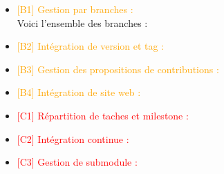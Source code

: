 \begin{itemize}
    \item \textcolor{orange}{[B1] Gestion par branches : }
    \\ Voici l'ensemble des branches : \\ 
    \item \textcolor{orange}{[B2] Intégration de version et tag : }
    \item \textcolor{orange}{[B3] Gestion des propositions de contributions : }
    \item \textcolor{orange}{[B4] Intégration de site web : }
    \item \textcolor{red}{[C1] Répartition de taches et milestone : }
    \item \textcolor{red}{[C2] Intégration continue : }
    \item \textcolor{red}{[C3] Gestion de submodule : }
\end{itemize}